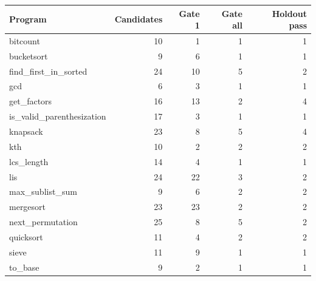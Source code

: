 \begin{tabular}{lrrrr}\toprule
Program & Candidates & Gate 1 & Gate all & Holdout pass\\\midrule
bitcount & 10 & 1 & 1 & 1\\
bucketsort & 9 & 6 & 1 & 1\\
find\_first\_in\_sorted & 24 & 10 & 5 & 2\\
gcd & 6 & 3 & 1 & 1\\
get\_factors & 16 & 13 & 2 & 4\\
is\_valid\_parenthesization & 17 & 3 & 1 & 1\\
knapsack & 23 & 8 & 5 & 4\\
kth & 10 & 2 & 2 & 2\\
lcs\_length & 14 & 4 & 1 & 1\\
lis & 24 & 22 & 3 & 2\\
max\_sublist\_sum & 9 & 6 & 2 & 2\\
mergesort & 23 & 23 & 2 & 2\\
next\_permutation & 25 & 8 & 5 & 2\\
quicksort & 11 & 4 & 2 & 2\\
sieve & 11 & 9 & 1 & 1\\
to\_base & 9 & 2 & 1 & 1\\
\bottomrule\end{tabular}
